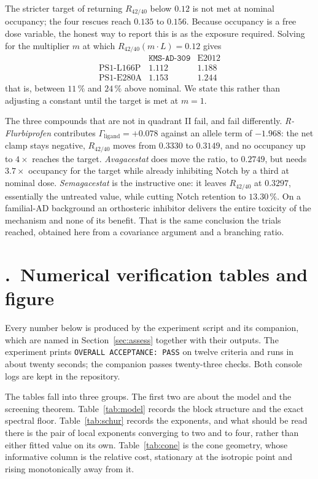 \documentclass[11pt,reqno]{amsart}
\theoremstyle{plain}
\theoremstyle{definition}
\theoremstyle{remark}
\numberwithin{equation}{section}
\newcommand{\lead}{\texttt{KMS-AD-309}}
\begin{document}
The stricter target of returning $R_{42/40}$ below $0.12$ is not met at nominal occupancy; the four rescues reach $0.135$ to $0.156$. Because occupancy is a free dose variable, the honest way to report this is as the exposure required. Solving for the multiplier $m$ at which $R_{42/40}(m\cdot L)=0.12$ gives
\[
\begin{array}{lcc}
 & \lead{} & \text{E2012}\\[2pt]
\text{PS1-L166P} & 1.112 & 1.188\\
\text{PS1-E280A} & 1.153 & 1.244
\end{array}
\]
that is, between $11\,\%$ and $24\,\%$ above nominal. We state this rather than adjusting a constant until the target is met at $m=1$.

The three compounds that are not in quadrant II fail, and fail differently. \emph{R-Flurbiprofen} contributes $\Gamma_{\mathrm{ligand}}=+0.078$ against an allele term of $-1.968$: the net clamp stays negative, $R_{42/40}$ moves from $0.3330$ to $0.3149$, and no occupancy up to $4\times$ reaches the target. \emph{Avagacestat} does move the ratio, to $0.2749$, but needs $3.7\times$ occupancy for the target while already inhibiting Notch by a third at nominal dose. \emph{Semagacestat} is the instructive one: it leaves $R_{42/40}$ at $0.3297$, essentially the untreated value, while cutting Notch retention to $13.30\,\%$. On a familial-AD background an orthosteric inhibitor delivers the entire toxicity of the mechanism and none of its benefit. That is the same conclusion the trials reached, obtained here from a covariance argument and a branching ratio.

\section*{\thesection.\ Numerical verification tables and figure}
\label{sec:tables}
\setcounter{theorem}{0}

Every number below is produced by the experiment script and its companion, which are named in Section~\ref{sec:assess} together with their outputs. The experiment prints \texttt{OVERALL ACCEPTANCE: PASS} on twelve criteria and runs in about twenty seconds; the companion passes twenty-three checks. Both console logs are kept in the repository.

The tables fall into three groups. The first two are about the model and the screening theorem. Table~\ref{tab:model} records the block structure and the exact spectral floor. Table~\ref{tab:schur} records the exponents, and what should be read there is the pair of local exponents converging to two and to four, rather than either fitted value on its own. Table~\ref{tab:cone} is the cone geometry, whose informative column is the relative cost, stationary at the isotropic point and rising monotonically away from it.
\end{document}

